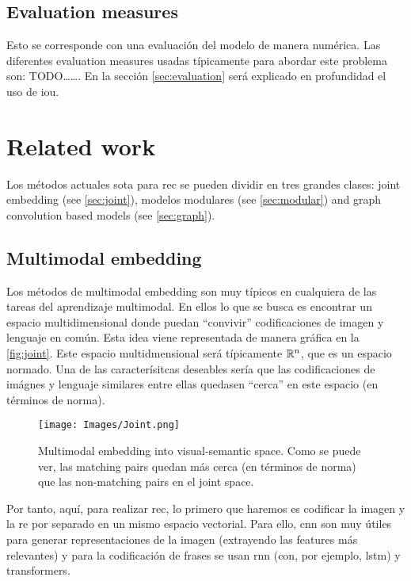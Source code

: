 \subsection{Evaluation measures} \label{sec:eval-measure}

Esto se corresponde con una evaluación del modelo de manera numérica. Las
diferentes evaluation measures usadas típicamente para abordar este problema
son: TODO\ldots\ldots. En la sección \vref{sec:evaluation} será explicado en
profundidad el uso de \gls{iou}.


\section{Related work}

Los métodos actuales \gls{sota} para \gls{rec} se pueden dividir en tres
grandes clases: joint embedding (see \vref{sec:joint}), modelos modulares (see
\vref{sec:modular}) and graph convolution based models (see
\vref{sec:graph}).

\subsection{Multimodal embedding} \label{sec:joint} Los métodos de multimodal
embedding son muy típicos en cualquiera de las tareas del aprendizaje
multimodal. En ellos lo que se busca es encontrar un espacio multidimensional
donde puedan ``convivir'' codificaciones de imagen y lenguaje en común. Esta
idea viene representada de manera gráfica en la \vref{fig:joint}. Este espacio
multidmensional será típicamente \(\mathbb{R}^n\), que es un espacio normado. Una de
las caracterísitcas deseables sería que las codificaciones de imágnes y
lenguaje similares entre ellas quedasen ``cerca'' en este espacio (en términos
de norma).

\begin{figure}[ht]
  \centering
  \texttt{[image: Images/Joint.png]}
  \caption[Multimodal embedding technique]{Multimodal embedding into
    visual-semantic space. Como se puede ver, las matching pairs quedan más
    cerca (en términos de norma) que las non-matching pairs en el joint space.}
  \label{fig:joint}
\end{figure}

Por tanto, aquí, para realizar \gls{rec}, lo primero que haremos es codificar
la imagen y la \gls{re} por separado en un mismo espacio vectorial. Para ello,
\gls{cnn} son muy útiles para generar representaciones de la imagen (extrayendo
las features más relevantes) y para la codificación de frases se usan \gls{rnn}
(con, por ejemplo, \gls{lstm}) y transformers.

